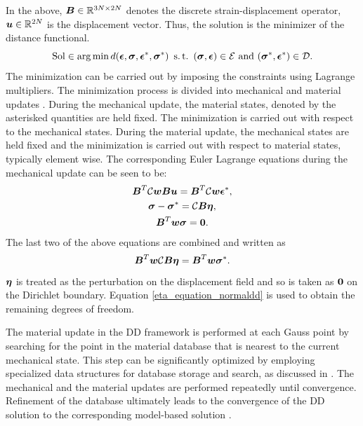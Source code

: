 \documentclass[10pt]{cas-sc}
\begin{document}
In the above, $\mbox{\boldmath $B$} \in \mathbb{R}^{3N\times 2N}$ denotes the discrete strain-displacement operator, $\mbox{\boldmath $u$} \in \mathbb{R}^{2N}$ is the displacement vector. Thus, the solution is the minimizer of the distance functional.
\begin{equation}
	{\rm Sol} \in \arg \min d(\mbox{\boldmath $\epsilon$},\mbox{\boldmath $\sigma$},\mbox{\boldmath $\epsilon$}^*,\mbox{\boldmath $\sigma$}^*) \text{ } \operatorname{s.t.} \text{ } (\mbox{\boldmath $\sigma$} , \mbox{\boldmath $\epsilon$}) \in  \mathcal{E} \text{ and } (\mbox{\boldmath $\sigma$}^* , \mbox{\boldmath $\epsilon$}^*) \in  \mathcal{D}.
\end{equation}
The minimization can be carried out by imposing the constraints using Lagrange multipliers. The minimization process is divided into mechanical and material updates \cite{Kirchdoerfer2016}. During the mechanical update, the material states, denoted by the asterisked quantities are held fixed. The minimization is carried out with respect to the mechanical states. During the material update, the mechanical states are held fixed and the minimization is carried out with respect to material states, typically element wise.
The corresponding Euler Lagrange equations during the mechanical update can be seen to be:
%
\begin{gather}
	\mbox{\boldmath $B$}^T \mathcal{C}\mbox{\boldmath $w$} \mbox{\boldmath $B$} \mbox{\boldmath $u$} = \mbox{\boldmath $B$}^T \mathcal{C}\mbox{\boldmath $w$} \mbox{\boldmath $\epsilon$}^*, \label{disp_equation_normaldd}\\
	\mbox{\boldmath $\sigma$} - \mbox{\boldmath $\sigma$}^* =  \mathcal{C} \mbox{\boldmath $B$} \mbox{\boldmath $\eta$}, \\
	\mbox{\boldmath $B$}^T \mbox{\boldmath $w$}\mbox{\boldmath $\sigma$} = \mathbf{0}.
\end{gather}
%
The last two of the above equations are combined and written as 
\begin{equation}
 \mbox{\boldmath $B$}^T \mbox{\boldmath $w$}\mathcal{C} \mbox{\boldmath $B$} \mbox{\boldmath $\eta$} = \mbox{\boldmath $B$}^T \mbox{\boldmath $w$}\mbox{\boldmath $\sigma$}^*. \label{eta_equation_normaldd}
\end{equation}
$\mbox{\boldmath $\eta$}$ is treated as the perturbation on the displacement field and so is taken as $\bf0$ on the Dirichlet boundary. Equation \eqref{eta_equation_normaldd} is used to obtain the remaining degrees of freedom.

The material update in the DD framework is performed at each Gauss point by searching for the point in the material database that is nearest to the current mechanical state. This step can be significantly optimized by employing specialized data structures for database storage and search, as discussed in \cite{Eggersmann2021}. The mechanical and the material updates are performed repeatedly until convergence. Refinement of the database ultimately leads to the convergence of the DD solution to the corresponding model-based solution \cite{Conti2018}.
\end{document}
